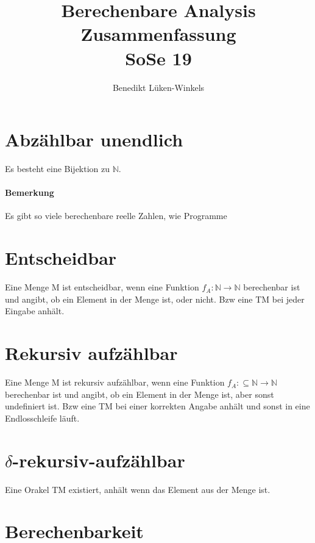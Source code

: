 \documentclass[ngerman]{scrartcl}
\title{Berechenbare Analysis \\ Zusammenfassung \\ SoSe 19}
\author{Benedikt Lüken-Winkels}
\begin{document}
\maketitle
\tableofcontents


\section{Abzählbar unendlich} 
Es besteht eine Bijektion zu $ \mathbb{N} $. 
\paragraph{Bemerkung} Es gibt so viele berechenbare reelle Zahlen, wie Programme

\section{Entscheidbar} 
Eine Menge M ist entscheidbar, wenn eine Funktion $ f_A : \mathbb{N} \rightarrow \mathbb{N} $ berechenbar ist und angibt, ob ein Element in der Menge ist, oder nicht. Bzw eine TM bei jeder Eingabe anhält.

\section{Rekursiv aufzählbar} 
Eine Menge M ist rekursiv aufzählbar, wenn eine Funktion $ f_A : \subseteq \mathbb{N} \rightarrow \mathbb{N} $ berechenbar ist und angibt, ob ein Element in der Menge ist, aber sonst undefiniert ist. Bzw eine TM bei einer korrekten Angabe anhält und sonst in eine Endlosschleife läuft.

\section{$ \delta $-rekursiv-aufzählbar} Eine Orakel TM existiert, anhält wenn das Element aus der Menge ist.

\section{Berechenbarkeit} 
\end{document}
